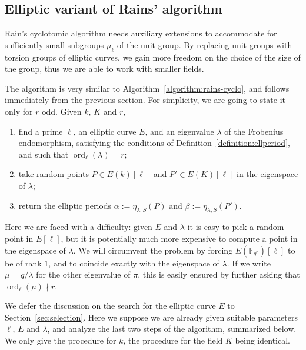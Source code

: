 \documentclass[12pt]{article}
\theoremstyle{plain}
\theoremstyle{definition}
\DeclareMathOperator{\order}{ord} %
\def\F{\ensuremath{\mathbb{F}}}
\newcounter{algorithm}
\begin{document}
\subsection{Elliptic variant of Rains' algorithm}

Rain's cyclotomic algorithm needs auxiliary extensions to accommodate
for sufficiently small subgroups $\mu_\ell$ of the unit group. By
replacing unit groups with torsion groups of elliptic curves, we gain
more freedom on the choice of the size of the group, thus we are able
to work with smaller fields.  

The algorithm is very similar to
Algorithm~\ref{algorithm:rains-cyclo}, and follows immediately from
the previous section. For simplicity, we are going to state it only
for $r$ odd. Given $k$, $K$ and $r$,
\begin{enumerate}
\item find a prime $\ell$, an elliptic curve $E$, and an eigenvalue
  $\lambda$ of the Frobenius endomorphism, satisfying the conditions
  of Definition~\ref{definition:ellperiod}, and such that
  $\order_\ell(\lambda)=r$;
\item take random points $P\in E(k)[\ell]$ and $P'\in E(K)[\ell]$ in
  the eigenspace of $\lambda$;
\item return the elliptic periods $\alpha := \eta_{\lambda,S}(P)$ and
  $\beta:= \eta_{\lambda,S}(P')$.
\end{enumerate}

Here we are faced with a difficulty: given $E$ and $\lambda$ it is
easy to pick a random point in $E[\ell]$, but it is potentially much
more expensive to compute a point in the eigenspace of $\lambda$. We
will circumvent the problem by forcing $E(\F_{q^r})[\ell]$ to be of
rank $1$, and to coincide exactly with the eigenspace of $\lambda$.
If we write $\mu = q/\lambda$ for the other eigenvalue of $\pi$, this
is easily ensured by further asking that $\order_\ell(\mu) \nmid r$.

We defer the discussion on the search for the elliptic curve $E$ to
Section~\ref{sec:selection}. Here we suppose we are already given
suitable parameters $\ell$, $E$ and $\lambda$, and analyze the last
two steps of the algorithm, summarized below.  We only give the
procedure for $k$, the procedure for the field $K$ being
identical.
\end{document}
